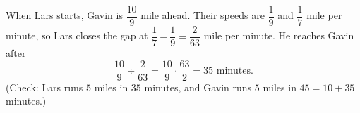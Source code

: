 When Lars starts, Gavin is $\dfrac{10}{9}$ mile ahead. Their speeds are $\dfrac{1}{9}$ and $\dfrac{1}{7}$ mile per minute, so Lars closes the gap at $\dfrac{1}{7}-\dfrac{1}{9}=\dfrac{2}{63}$ mile per minute. He reaches Gavin after
\[
\dfrac{10}{9}\div\dfrac{2}{63}=\dfrac{10}{9}\cdot\dfrac{63}{2}=\boxed{35}\text{ minutes}.
\]
(Check: Lars runs $5$ miles in $35$ minutes, and Gavin runs $5$ miles in $45=10+35$ minutes.)
